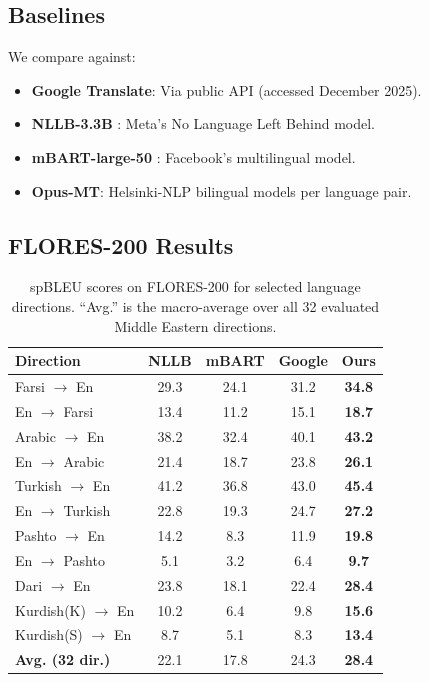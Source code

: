 \documentclass[11pt,twocolumn]{article}
\begin{document}
\subsection{Baselines}

We compare against:
\begin{itemize}[leftmargin=*,noitemsep]
  \item \textbf{Google Translate}: Via public API (accessed December 2025).
  \item \textbf{NLLB-3.3B} \citep{costa2022no}: Meta's No Language Left Behind model.
  \item \textbf{mBART-large-50} \citep{liu2020multilingual}: Facebook's multilingual model.
  \item \textbf{Opus-MT}: Helsinki-NLP bilingual models per language pair.
\end{itemize}

\subsection{FLORES-200 Results}

\begin{table}[h]
\centering
\caption{spBLEU scores on FLORES-200 for selected language directions.
``Avg.'' is the macro-average over all 32 evaluated Middle Eastern directions.}
\label{tab:flores}
\begin{tabular}{lcccc}
\toprule
\textbf{Direction} & \textbf{NLLB} & \textbf{mBART} & \textbf{Google} & \textbf{Ours} \\
\midrule
Farsi $\to$ En & 29.3 & 24.1 & 31.2 & \textbf{34.8} \\
En $\to$ Farsi & 13.4 & 11.2 & 15.1 & \textbf{18.7} \\
Arabic $\to$ En & 38.2 & 32.4 & 40.1 & \textbf{43.2} \\
En $\to$ Arabic & 21.4 & 18.7 & 23.8 & \textbf{26.1} \\
Turkish $\to$ En & 41.2 & 36.8 & 43.0 & \textbf{45.4} \\
En $\to$ Turkish & 22.8 & 19.3 & 24.7 & \textbf{27.2} \\
Pashto $\to$ En & 14.2 & 8.3 & 11.9 & \textbf{19.8} \\
En $\to$ Pashto & 5.1 & 3.2 & 6.4 & \textbf{9.7} \\
Dari $\to$ En & 23.8 & 18.1 & 22.4 & \textbf{28.4} \\
Kurdish(K) $\to$ En & 10.2 & 6.4 & 9.8 & \textbf{15.6} \\
Kurdish(S) $\to$ En & 8.7 & 5.1 & 8.3 & \textbf{13.4} \\
\midrule
\textbf{Avg. (32 dir.)} & 22.1 & 17.8 & 24.3 & \textbf{28.4} \\
\bottomrule
\end{tabular}
\end{table}
\end{document}
